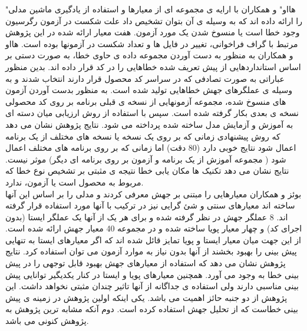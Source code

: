  "هااو" و همکاران با ارایه ی مجموعه ای از معیارها و استفاده از یادگیری ماشین مدلی را ارائه داده اند که به وسیله ی آن بتوان تشخیص داد علت شکست در آزمون رگرسیون وجود خطا است یا منسوخ  شدن یک مورد آزمون. هفت معیار ارائه شده در این پژوهش مرتبط با گراف فراخوانی، تغییر در فایل ها و تعداد شکست در آزمونها بوده است.  هااو و همکاران به منظور به دست آوردن مجموعه داده ی حاوی خطا، به صورت دستی بر اساس استانداردهایی  از پیش تعریف شده خطاهایی را در کد قرار داده اند. بدین منظور عباراتی به صورت تصادفی که در سراسر کد محصول قرار دارند انتخاب شدند و به وسیله ی عملگرهای جهش خطاهایی تولید شده است. به منظور بدست آوردن آزمون های منسوخ شده، مجموعه آزمونهایی از نسخه ی قبلی برنامه بر روی کد محصولی نسخه ی بعدی بکار گرفته شده است. سپس با استفاده از روش ارزیابی میان دسته ای به آموزش و آزمایش مدل ساخته شده پرداخته می شود. نتایج پژوهش نشان می دهد که روش پیشنهادی زمانی که بر روی یک نسخه یا نسخه های مختلف از یک برنامه اعمال شود نتایج خوبی دارد (80\lr{\%} دقت) اما زمانی که بر روی برنامه های مختلف اعمال شود ( مجموعه آموزش از یک برنامه و آزمون بر روی برنامه ای دیگر) موثر نیست. نتایج نشان می دهد تکنیک ها مکان یابی خطا نتیجه ی مثبتی بر تشخیص نوع خطا که مربوط به محصول است یا آزمون، ندارد.\\
 
 بوئز و همکاران معیارهایی را مبتنی بر جهش معرفی کردند و مدلی را بر اساس این آنها ساخته اند\cite{bowes2016mutation} معیارهای سنتی و شئ گرایی نیز در ترکیب با آنها مورد استفاده قرار گرفته اند. 8 عملگر جهش در نظر گرفته شده و برای هر یک از آنها یک عملگر ایستا (بدون اجرای کد) و چهار معیار پویا ساخته شده و در مجموعه 40 معیار جهش ارائه شده است. از این جهت میان معیار ایستا و پویا تمایز قائل شده اند که اگر معیارهای ایستا به تنهایی  پیش بینی را بهبود بخشند از آنها بدون نیاز به موارد آزمون می توان استفاده کرد. نتایج پژوهش نشان می دهد که استفاده از معیارهای جهش بهبود قابل توجهی را در پیش بینی خطا به وجود می آورد. همچنین معیارهای پویا و ایستا در کنار یکدیگیر توانایی پیش بینی مناسبی دارند ولی استفاده ی جداگانه از آنها تاثیر چندان مثبتی نخواهد داشت. این پژوهش از دو جنبه حائز اهمیت می باشد. یکی اینکه اولین پژوهش در زمینه ی پیش بینی خطاست که از تحلیل جهش استفاده کرده است. دوم آنکه مشابه ترین پژوهش به پژوهش کنونی می باشد. 
 
 
 
 
 
 
 
 
 
 
 
 
 
 
 
 
 
 
 
 
 

